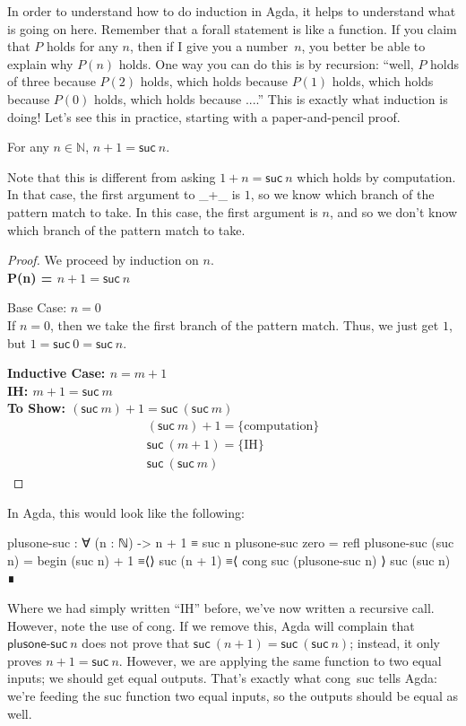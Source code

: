 \documentclass{lecturenotes}
\begin{document}
In order to understand how to do induction in Agda, it helps to understand what is going on here.
Remember that a forall statement is like a function.
If you claim that $P$ holds for any $n$, then if I give you a number~$n$, you better be able to explain why $P(n)$ holds.
One way you can do this is by recursion: ``well, $P$ holds of three because $P(2)$ holds, which holds because $P(1)$ holds, which holds because $P(0)$ holds, which holds because ....''
This is exactly what induction is doing!
Let's see this in practice, starting with a paper-and-pencil proof.
\begin{thm}
  For any $n \in \mathbb{N}$, $n + 1 = \textsf{suc}~n$.
\end{thm}

Note that this is different from asking $1 + n = \textsf{suc}~n$ which holds by computation.
In that case, the first argument to \textsf{\_+\_} is $1$, so we know which branch of the pattern match to take.
In this case, the first argument is $n$, and so we don't know which branch of the pattern match to take.

\begin{proof}
  We proceed by induction on $n$.\\
  \textbf{P(n) = $n + 1 = \textsf{suc}~n$}

  \noindent \textsf{Base Case: $n = 0$}\\
  If $n = 0$, then we take the first branch of the pattern match.
  Thus, we just get $1$, but $1 = \textsf{suc}~0 = \textsf{suc}~n$.

  \noindent \textbf{Inductive Case: $n = m + 1$}\\
  \textbf{IH: $m + 1 = \textsf{suc}~m$}\\
  \textbf{To Show: $(\textsf{suc}~m) + 1 = \textsf{suc}~(\textsf{suc}~m)$}\\
  $$\begin{array}{l}
    (\textsf{suc}~m) + 1 =\{\text{computation}\}\\
    \textsf{suc}~(m + 1) =\{\text{IH}\}\\
    \textsf{suc}~(\textsf{suc}~m)
  \end{array}$$
\end{proof}

\pagebreak
In Agda, this would look like the following:
\begin{center}
\begin{code}
  plusone-suc : ∀ (n : ℕ) -> n + 1 ≡ suc n
  plusone-suc zero = refl
  plusone-suc (suc n) =
    begin
      (suc n) + 1
    ≡⟨⟩
      suc (n + 1)
    ≡⟨ cong suc (plusone-suc n) ⟩
      suc (suc n)
    ∎
\end{code}
\end{center}
Where we had simply written ``IH'' before, we've now written a recursive call.
However, note the use of \textsf{cong}.
If we remove this, Agda will complain that $\textsf{plusone-suc}~n$ does not prove that $\textsf{suc}~(n+1) = \textsf{suc}~(\textsf{suc}~n)$; instead, it only proves $n + 1 = \textsf{suc}~n$.
However, we are applying the same function to two equal inputs; we should get equal outputs.
That's exactly what \textsf{cong~suc} tells Agda: we're feeding the \textsf{suc} function two equal inputs, so the outputs should be equal as well.
\end{document}
